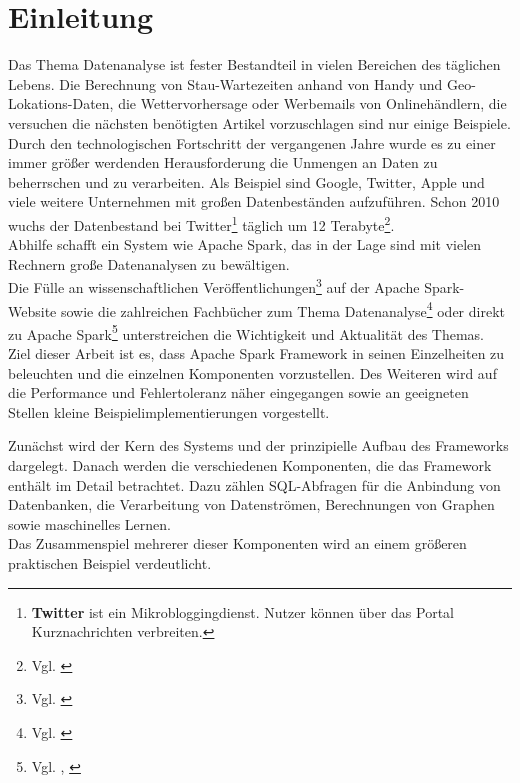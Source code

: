 \newpage
\chapter{Einleitung} 

Das Thema Datenanalyse ist fester Bestandteil in vielen Bereichen des täglichen Lebens. Die Berechnung von Stau-Wartezeiten anhand von Handy und Geo-Lokations-Daten, die Wettervorhersage oder Werbemails von Onlinehändlern, die versuchen die nächsten benötigten Artikel vorzuschlagen sind nur einige Beispiele.\\

\noindent
Durch den technologischen Fortschritt der vergangenen Jahre wurde es zu einer immer größer werdenden Herausforderung die Unmengen an Daten zu beherrschen und zu verarbeiten. Als Beispiel sind Google, Twitter, Apple und viele weitere Unternehmen mit großen Datenbeständen aufzuführen. Schon 2010 wuchs der Datenbestand bei Twitter\footnote{\textbf{Twitter} ist ein Mikrobloggingdienst. Nutzer können über das Portal Kurznachrichten verbreiten. } täglich um 12 Terabyte\footnote{Vgl. \cite{TWITTER_12}}. \\
Abhilfe schafft ein System wie Apache Spark, das in der Lage sind mit vielen Rechnern große Datenanalysen zu bewältigen. \\

\noindent
Die Fülle an wissenschaftlichen Veröffentlichungen\footnote{Vgl. \cite{SPRESEARCH}} auf der Apache Spark-Website sowie die zahlreichen Fachbücher zum Thema Datenanalyse\footnote{Vgl. \cite{DA15}} oder direkt zu Apache Spark\footnote{Vgl. \cite{AAWS15}, \cite{BDS16}} unterstreichen die Wichtigkeit und Aktualität des Themas.\\

\noindent
Ziel dieser Arbeit ist es, dass Apache Spark Framework in seinen Einzelheiten zu beleuchten und die einzelnen Komponenten vorzustellen. Des Weiteren wird auf die Performance und Fehlertoleranz näher eingegangen sowie an geeigneten Stellen kleine Beispielimplementierungen vorgestellt.

\noindent
Zunächst wird der Kern des Systems und der prinzipielle Aufbau des Frameworks dargelegt. Danach werden die verschiedenen Komponenten, die das Framework enthält im Detail betrachtet. Dazu zählen SQL-Abfragen für die Anbindung von Datenbanken, die Verarbeitung von Datenströmen, Berechnungen von Graphen sowie maschinelles Lernen.\\
Das Zusammenspiel mehrerer dieser Komponenten wird an einem größeren praktischen Beispiel verdeutlicht. \\

